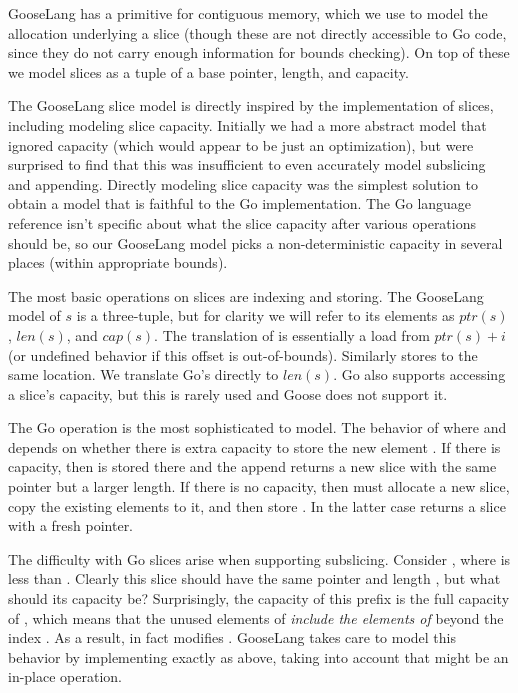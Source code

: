 GooseLang has a primitive for contiguous memory, which we use to model
the allocation underlying a slice (though these are not directly
accessible to Go code, since they do not carry enough information for
bounds checking). On top of these we model slices as a tuple of a base
pointer, length, and capacity.

The GooseLang slice model is directly inspired by the implementation of
slices, including modeling slice capacity. Initially we had a more
abstract model that ignored capacity (which would appear to be just an
optimization), but were surprised to find that this was insufficient to
even accurately model subslicing and appending. Directly modeling slice
capacity was the simplest solution to obtain a model that is faithful to
the Go implementation. The Go language reference isn't specific about
what the slice capacity after various operations should be, so our
GooseLang model picks a non-deterministic capacity in several places
(within appropriate bounds).

The most basic operations on slices are indexing and storing. The
GooseLang model of $s$ is a three-tuple, but for clarity we will refer
to its elements as $ptr(s)$, $len(s)$, and $cap(s)$. The
translation of  is essentially a load from
$ptr(s) + i$ (or undefined behavior if this offset is out-of-bounds).
Similarly  stores to the same location. We
translate Go's  directly to $len(s)$. Go also supports
accessing a slice's capacity, but this is rarely used and Goose does not
support it.

The Go  operation is the most sophisticated to model. The
behavior of  where  and
 depends on whether there is extra capacity to store the
new element . If there is capacity, then  is stored
there and the append returns a new slice with the same pointer but a
larger length. If there is no capacity, then  must
allocate a new slice, copy the existing elements to it, and then store
. In the latter case  returns a slice with a
fresh pointer.

The difficulty with Go slices arise when supporting subslicing. Consider
, where  is less than .
Clearly this slice should have the same pointer and length ,
but what should its capacity be? Surprisingly, the capacity of this
prefix is the full capacity of , which means that the unused
elements of  \emph{include the elements of }
beyond the index . As a result, 
in fact modifies . GooseLang takes care to model this
behavior by implementing  exactly as above, taking into
account that  might be an in-place operation.

